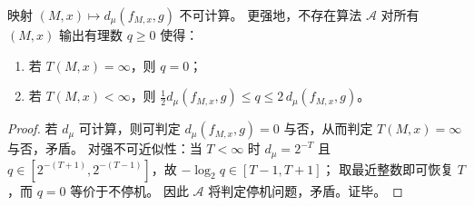 \begin{corollary}\label{cor:fold-computability-eps-sound-distance-noncomputable-inapproximable}
映射 \((M,x)\mapsto d_\mu(f_{M,x},g)\) 不可计算。
更强地，不存在算法 \(\mathcal A\) 对所有 \((M,x)\) 输出有理数 \(q\ge 0\) 使得：
\begin{enumerate}
\normalfont
  \item 若 \(T(M,x)=\infty\)，则 \(q=0\)；
  \item 若 \(T(M,x)<\infty\)，则 \(\tfrac12 d_\mu(f_{M,x},g)\le q\le 2\,d_\mu(f_{M,x},g)\)。
\end{enumerate}
\end{corollary}

\begin{proof}
若 \(d_\mu\) 可计算，则可判定 \(d_\mu(f_{M,x},g)=0\) 与否，从而判定 \(T(M,x)=\infty\) 与否，矛盾。
对强不可近似性：当 \(T<\infty\) 时 \(d_\mu=2^{-T}\) 且 \(q\in[2^{-(T+1)},2^{-(T-1)}]\)，故 \(-\log_2 q\in[T-1,T+1]\)；
取最近整数即可恢复 \(T\)，而 \(q=0\) 等价于不停机。
因此 \(\mathcal A\) 将判定停机问题，矛盾。证毕。
\end{proof}

